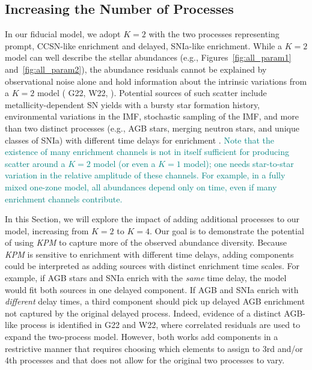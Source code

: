 \documentclass[modern]{aastex631}
\newcommand{\add}[1]{\textcolor{teal}{#1}}
\newcommand{\name}{\textsl{KPM}}
\begin{document}
\subsection{Increasing the Number of Processes} \label{subsec:k=4}

In our fiducial model, we adopt $K=2$ with the two processes representing prompt, CCSN-like enrichment and delayed, SNIa-like enrichment. While a $K=2$ model can well describe the stellar abundances (e.g., Figures~\ref{fig:all_param1} and~\ref{fig:all_param2}), the abundance residuals cannot be explained by observational noise alone and hold information about the intrinsic variations from a $K=2$ model (\citealp{ness2019} G22, W22, \citealp{ting2022, ratcliffe2023}). Potential sources of such scatter include metallicity-dependent SN yields with a bursty star formation history, environmental variations in the IMF, stochastic sampling of the IMF, and more than two distinct processes (e.g., AGB stars, merging neutron stars, and unique classes of SNIa) with different time delays for enrichment \citep[e.g.][]{belokurov2022, griffith2023}. \add{Note that the existence of many enrichment channels is not in itself sufficient for producing scatter around a $K=2$ model (or even a $K=1$ model); one needs star-to-star variation in the relative amplitude of these channels. For example, in a fully mixed one-zone model, all abundances depend only on time, even if many enrichment channels contribute.}

In this Section, we will explore the impact of adding additional processes to our model, increasing from $K=2$ to $K=4$. Our goal is to demonstrate the potential of using \name{} to capture more of the observed abundance diversity. Because \name{} is sensitive to enrichment with different time delays, adding components could be interpreted as adding sources with distinct enrichment time scales. For example, if AGB stars and SNIa enrich with the \textit{same} time delay, the model would fit both sources in one delayed component. If AGB and SNIa enrich with \textit{different} delay times, a third component should pick up delayed AGB enrichment not captured by the original delayed process. Indeed, evidence of a distinct AGB-like process is identified in G22 and W22, where correlated residuals are used to expand the two-process model. However, both works add components in a restrictive manner that requires choosing which elements to assign to 3rd and/or 4th processes and that does not allow for the original two processes to vary. 
\end{document}
